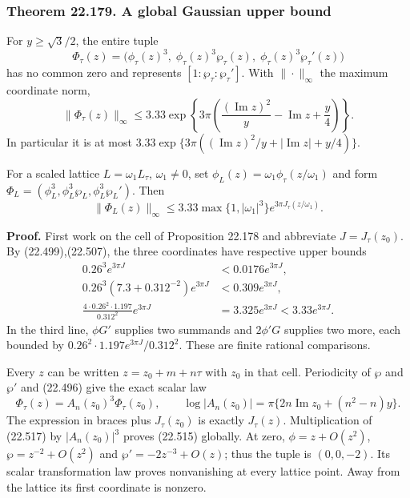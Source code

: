 \documentclass[
  11pt,
  a4paper,
]{article}
\begin{document}
\subsubsection{Theorem 22.179. A global Gaussian upper
bound}\label{theorem-22.179.-a-global-gaussian-upper-bound}

For \(y\ge\sqrt3/2\), the entire tuple \[
 \Phi_\tau(z)=
 \bigl(\phi_\tau(z)^3,\;
       \phi_\tau(z)^3\wp_\tau(z),\;
       \phi_\tau(z)^3\wp_\tau'(z)\bigr)
 \tag{22.514}
\] has no common zero and represents \([1:\wp_\tau:\wp_\tau']\). With
\(\|\cdot\|_\infty\) the maximum coordinate norm, \[
 \|\Phi_\tau(z)\|_\infty
 \le3.33\exp\left\{3\pi\left(
  \frac{(\operatorname{Im}z)^2}{y}
  -\operatorname{Im}z+\frac y4\right)\right\}.
 \tag{22.515}
\] In particular it is at most \(3.33\exp\{3\pi((\operatorname{Im}z)^2/y
 +|\operatorname{Im}z|+y/4)\}\).

For a scaled lattice \(L=\omega_1 L_\tau\), \(\omega_1\ne0\), set
\(\phi_L(z)=\omega_1\phi_\tau(z/\omega_1)\) and form
\(\Phi_L=(\phi_L^3,\phi_L^3\wp_L,\phi_L^3\wp_L')\). Then \[
 \|\Phi_L(z)\|_\infty
 \le3.33\max\{1,|\omega_1|^3\}
             e^{3\pi J_\tau(z/\omega_1)}.
 \tag{22.516}
\]

\textbf{Proof.} First work on the cell of Proposition 22.178 and
abbreviate \(J=J_\tau(z_0)\). By (22.499),(22.507), the three
coordinates have respective upper bounds \[
 \begin{split}
 0.26^3 e^{3\pi J}&<0.0176e^{3\pi J},\\
 0.26^3(7.3+0.312^{-2})e^{3\pi J}&<0.309e^{3\pi J},\\
 \frac{4\cdot0.26^2\cdot1.197}{0.312^2}e^{3\pi J}
 &=3.325e^{3\pi J}<3.33e^{3\pi J}.
 \end{split}
 \tag{22.517}
\] In the third line, \(\phi G'\) supplies two summands and \(2\phi'G\)
supplies two more, each bounded by
\(0.26^2\cdot1.197e^{3\pi J}/0.312^2\). These are finite rational
comparisons.

Every \(z\) can be written \(z=z_0+m+n\tau\) with \(z_0\) in that cell.
Periodicity of \(\wp\) and \(\wp'\) and (22.496) give the exact scalar
law \[
 \Phi_\tau(z)=A_n(z_0)^3\Phi_\tau(z_0),\qquad
 \log|A_n(z_0)|=\pi\{2n\operatorname{Im}z_0+(n^2-n)y\}.
 \tag{22.518}
\] The expression in braces plus \(J_\tau(z_0)\) is exactly
\(J_\tau(z)\). Multiplication of (22.517) by \(|A_n(z_0)|^3\) proves
(22.515) globally. At zero, \(\phi=z+O(z^2)\), \(\wp=z^{-2}+O(z^2)\) and
\(\wp'=-2z^{-3}+O(z)\); thus the tuple is \((0,0,-2)\). Its scalar
transformation law proves nonvanishing at every lattice point. Away from
the lattice its first coordinate is nonzero.
\end{document}
